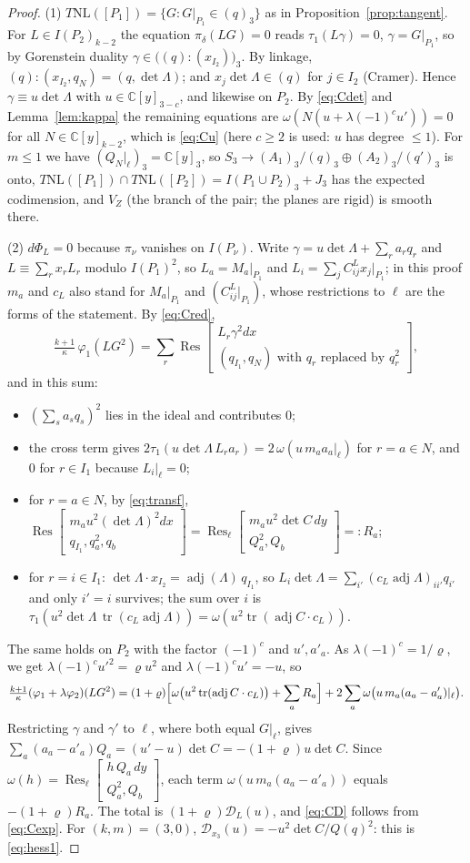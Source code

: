 \documentclass[10pt]{article}
\numberwithin{equation}{section}
\theoremstyle{remark}
\newcommand{\CC}{\mathbb{C}}
\newcommand{\NL}{\mathrm{NL}}
\newcommand{\VZ}{V_Z}
\newcommand{\cD}{\mathcal{D}}
\newcommand{\Res}{\operatorname{Res}}
\newcommand{\adj}{\operatorname{adj}}
\newcommand{\tr}{\operatorname{tr}}
\newcommand{\gres}[2]{\Res\!\begin{bmatrix} #1 \\ #2 \end{bmatrix}}
\newcommand{\lres}[2]{\Res_\ell\!\begin{bmatrix} #1 \\ #2 \end{bmatrix}}
\begin{document}
\begin{proof}
(1) $T\NL([P_1])=\{G:G|_{P_1}\in(q)_3\}$ as in Proposition~\ref{prop:tangent}. For $L\in I(P_2)_{k-2}$ the
equation $\pi_\delta(LG)=0$ reads $\tau_1(L\gamma)=0$, $\gamma=G|_{P_1}$, so by Gorenstein duality
$\gamma\in\bigl((q):(x_{I_2})\bigr)_3$. By linkage, $(q):(x_{I_2},q_N)=(q,\det\Lambda)$; and
$x_j\det\Lambda\in(q)$ for $j\in I_2$ (Cramer). Hence $\gamma\equiv u\det\Lambda$ with $u\in\CC[y]_{3-c}$, and
likewise on $P_2$. By \eqref{eq:Cdet} and Lemma~\ref{lem:kappa} the remaining equations are
$\omega(N(u+\lambda(-1)^cu'))=0$ for all $N\in\CC[y]_{k-2}$, which is \eqref{eq:Cu} (here $c\ge2$ is used: $u$
has degree $\le1$). For $m\le1$ we have $(Q_N|_\ell)_3=\CC[y]_3$, so $S_3\to(A_1)_3/(q)_3\oplus(A_2)_3/(q')_3$
is onto, $T\NL([P_1])\cap T\NL([P_2])=I(P_1\cup P_2)_3+J_3$ has the expected codimension, and $\VZ$ (the branch
of the pair; the planes are rigid) is smooth there.

(2) $d\Phi_L=0$ because $\pi_\nu$ vanishes on $I(P_\nu)$. Write $\gamma=u\det\Lambda+\sum_ra_rq_r$ and
$L\equiv\sum_rx_rL_r$ modulo $I(P_1)^2$, so $L_a=M_a|_{P_1}$ and $L_i=\sum_jC^L_{ij}x_j|_{P_1}$; in this proof
$m_a$ and $c_L$ also stand for $M_a|_{P_1}$ and $(C^L_{ij}|_{P_1})$, whose restrictions to $\ell$ are the forms
of the statement. By \eqref{eq:Cred},
\[
\tfrac{k+1}{\kappa}\,\varphi_1(LG^2)=\sum_r\gres{L_r\gamma^2dx}{(q_{I_1},q_N)\text{ with }q_r\text{ replaced by }q_r^2},
\]
and in this sum:
\begin{itemize}
\item $(\sum_sa_sq_s)^2$ lies in the ideal and contributes $0$;
\item the cross term gives $2\tau_1(u\det\Lambda\,L_ra_r)=2\,\omega(u\,m_aa_a|_\ell)$ for $r=a\in N$, and $0$ for
$r\in I_1$ because $L_i|_\ell=0$;
\item for $r=a\in N$, by \eqref{eq:transf}, $\gres{m_au^2(\det\Lambda)^2dx}{q_{I_1},q_a^2,q_b}
=\lres{m_au^2\det C\,dy}{Q_a^2,Q_b}=:R_a$;
\item for $r=i\in I_1$: $\det\Lambda\cdot x_{I_2}=\adj(\Lambda)\,q_{I_1}$, so $L_i\det\Lambda=\sum_{i'}
(c_L\adj\Lambda)_{ii'}q_{i'}$ and only $i'=i$ survives; the sum over $i$ is
$\tau_1(u^2\det\Lambda\,\tr(c_L\adj\Lambda))=\omega(u^2\tr(\adj C\cdot c_L))$.
\end{itemize}
The same holds on $P_2$ with the factor $(-1)^c$ and $u',a'_a$. As $\lambda(-1)^c=1/\varrho$, we get
$\lambda(-1)^cu'^2=\varrho u^2$ and $\lambda(-1)^cu'=-u$, so
\[
\tfrac{k+1}{\kappa}(\varphi_1+\lambda\varphi_2)(LG^2)=(1+\varrho)\Bigl[\omega\bigl(u^2\tr(\adj C\cdot c_L)\bigr)
+\sum_aR_a\Bigr]+2\sum_a\omega\bigl(u\,m_a(a_a-a'_a)|_\ell\bigr).
\]
Restricting $\gamma$ and $\gamma'$ to $\ell$, where both equal $G|_\ell$, gives $\sum_a(a_a-a'_a)Q_a=(u'-u)\det
C=-(1+\varrho)u\det C$. Since $\omega(h)=\lres{h\,Q_a\,dy}{Q_a^2,Q_b}$, each term
$\omega(u\,m_a(a_a-a'_a))$ equals $-(1+\varrho)R_a$. The total is $(1+\varrho)\cD_L(u)$, and \eqref{eq:CD}
follows from \eqref{eq:Cexp}. For $(k,m)=(3,0)$, $\cD_{x_3}(u)=-u^2\det C/Q(q)^2$: this is \eqref{eq:hess1}.


\end{proof}
\end{document}
